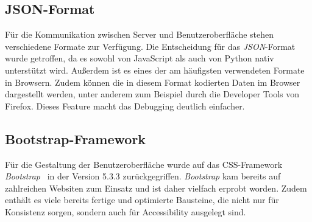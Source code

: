 \subsection{JSON-Format}

Für die Kommunikation zwischen Server und Benutzeroberfläche stehen verschiedene Formate zur Verfügung. Die Entscheidung für das \textit{JSON}-Format wurde getroffen, 
da es sowohl von JavaScript als auch von Python nativ unterstützt wird. Außerdem ist es eines der am häufigsten verwendeten Formate in Browsern.
Zudem können die in diesem Format kodierten Daten im Browser dargestellt werden, unter anderem
zum Beispiel durch die Developer Tools von Firefox. Dieses Feature macht das Debugging deutlich einfacher. 

\subsection{Bootstrap-Framework}

Für die Gestaltung der Benutzeroberfläche wurde auf das CSS-Framework \textit{Bootstrap}~\cite{bootstrap} in der Version 5.3.3 zurückgegriffen.
\textit{Bootstrap} kam bereits auf zahlreichen Websiten zum Einsatz und ist daher vielfach erprobt worden.
Zudem enthält es viele bereits fertige und optimierte Bausteine, die nicht nur für Konsistenz sorgen, sondern auch für Accessibility ausgelegt sind. 
